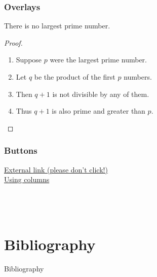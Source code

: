 \documentclass[aspectratio=169]{beamer}
\begin{document}
\begin{frame}
    \frametitle{Overlays}
    \begin{theorem}
        There is no largest prime number.
    \end{theorem}
    \begin{proof}
        \begin{enumerate}
            \item<1-| alert@1> Suppose $p$ were the largest prime number.
            \item<2-> Let $q$ be the product of the first $p$ numbers.\footnotemark[1]
            \item<3-> Then $q+1$ is not divisible by any of them.\footnotemark[1]
            \item<1-> Thus $q+1$ is also prime and greater than $p$.
        \end{enumerate}
    \end{proof}
\end{frame}

\begin{frame}
    \frametitle{Buttons}

    \href{https://youtu.be/dQw4w9WgXcQ}{External link (please don't click!)}\\
    \hyperlink{usingcols}{Using columns}\\
    \hyperlink{contents}{}\\
    \hyperlink{acronyms}{}\\
    \hyperlink{image}{}\\
    \hyperlink{table}{}
\end{frame}

\section{Bibliography}
\framesection

\begin{frame}{Bibliography}
    
    
\end{frame}
\end{document}
